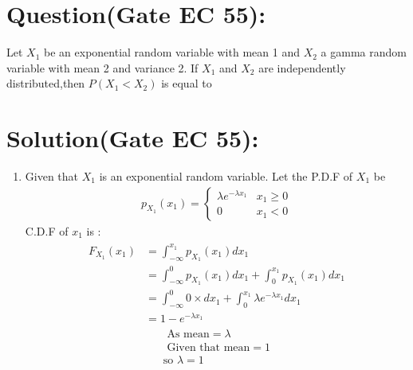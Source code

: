 \documentclass[journal,12pt,twocolumn]{IEEEtran}
\begin{document}
\section*{Question(Gate EC 55):}
 Let $X_1$ be an exponential random variable
with mean 1 and $X_2$ a gamma random variable
with mean 2 and variance 2. If $X_1$ and $X_2$ are
independently distributed,then $P(X_1 < X_2)$ is equal to
\section*{Solution(Gate EC 55):}
\begin{enumerate}
    \item Given that $X_1$ is an exponential random variable. Let the P.D.F of $X_1$ be
    \begin{align}
    p_{X_1}(x_1)=
        \begin{cases}
        \lambda e^{-\lambda x_1} & x_1 \geq 0\\
        0 & x_1<0
        \end{cases}
    \end{align}
    C.D.F of $x_1$ is :
    \begin{align}
    \begin{split}
        F_{X_1}(x_1)&=\int_{-\infty}^{x_1} p_{X_1}(x_1) dx_1\\
        &=\int_{-\infty}^0 p_{X_1}(x_1) dx_1+\int_{0}^{x_1} p_{X_1}(x_1) dx_1\\
        &=\int_{-\infty}^0 0 \times dx_1+\int_{0}^ {x_1} \lambda e^{-\lambda x_1} dx_1\\
        &=1-e^{-\lambda x_1}\label{eq:0.0.2}
        \end{split}
    \end{align}
    \begin{align}
    \text{ As mean}=\lambda\\
     \text{ Given that mean}=1\\
     \text{so } \lambda=1 \label{eq:0.0.5}
    \end{align} 
     

\end{enumerate}
\end{document}
